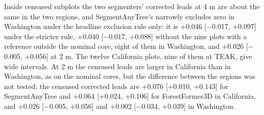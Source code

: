 \documentclass[10pt]{article}
\begin{document}
Inside censused subplots the two segmenters' corrected leads at 4 m are about
the same in the two regions, and SegmentAnyTree's narrowly excludes zero in
Washington under the headline exclusion rule only: it is +0.046 [$-$0.017, +0.097]
under the stricter rule, +0.040 [$-$0.017, +0.088] without the nine plots with a
reference outside the nominal core, eight of them in Washington, and +0.026
[$-$0.005, +0.056] at 2 m. The twelve California plots, nine of them at TEAK, give
wide intervals. At 2 m the censused leads are larger in California than in
Washington, as on the nominal cores, but the difference between the regions was
not tested: the censused corrected leads are +0.076 [+0.010, +0.143] for
SegmentAnyTree and +0.064 [+0.024, +0.106] for ForestFormer3D in California, and
+0.026 [$-$0.005, +0.056] and +0.002 [$-$0.034, +0.039] in Washington.
\end{document}
